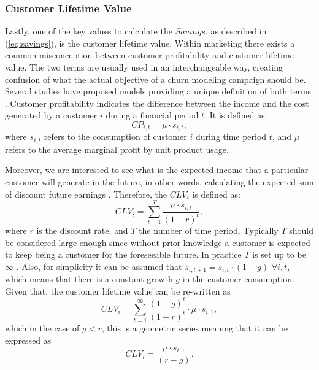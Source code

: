   \subsubsection{Customer Lifetime Value}
  Lastly, one of the key values to calculate the $Savings$, as described in (\ref{eq:savings}), is 
the customer lifetime value. Within marketing there exists a common misconception between customer 
profitability and customer lifetime value. The two terms are usually used in an interchangeable 
way, 
creating confusion of what the actual objective of a churn modeling campaign should be. Several 
studies have proposed models providing a unique definition of both terms 
\citep{Neslin2006,Pfeifer2004,Milne1999a,VanRaaij2003}. Customer 
profitability indicates the difference between the income and the cost 
generated by a customer $i$ during a financial period $t$. It is defined as: 
\begin{equation}
	CP_{i,t} = \mu  \cdot s_{i,t},
\end{equation}
where  $s_{i,t}$ refers to the consumption of customer $i$ during time period $t$, and $\mu$ refers 
to the average marginal profit by unit product usage.  

Moreover, we are interested to see what is the expected income that a particular customer will 
generate in the future, in other words, calculating the expected sum of 
discount future earnings \citep{Neslin2006}. Therefore, the $CLV_i$ is defined as:
\begin{equation}
	CLV_i = \sum_{t=1}^T\frac{\mu \cdot s_{i,t}}{(1+r)^t},
\end{equation}
where $r$ is the discount rate, and $T$ the number of time period.
Typically $T$ should be considered large enough since without prior 
knowledge a customer is expected to keep being a customer for the foreseeable future. In practice 
$T$ is set up to be $\infty$ \citep{Glady2009}. Also, for simplicity it can be assumed that 
$s_{i,t+1}=s_{i,t}\cdot (1+g)$ $\forall {i,t}$, which means that there is a constant growth $g$ in 
the customer consumption. Given that, the customer lifetime value can be re-written as
\begin{equation}
 CLV_i = \sum_{t=1}^\infty\frac{ (1+g)^t}{(1+r)^t}\cdot \mu\cdot s_{i,1},
\end{equation}
which in the case of $g<r$, this is a geometric series meaning that it can be expressed as
\begin{equation}
 CLV_i = \frac{\mu\cdot s_{i,1}}{(r-g)}.
\end{equation}

